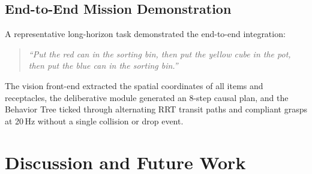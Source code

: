 \documentclass[conference]{IEEEtran}
\begin{document}
\begin{table}[!t]
\centering
\caption{End-to-End Subsystem Performance and Latency Breakdown}
\label{tab:subsystem_performance}
\end{table}

\subsection{End-to-End Mission Demonstration}
A representative long-horizon task demonstrated the end-to-end integration:
\begin{quote}
\textit{``Put the red can in the sorting bin, then put the yellow cube in the pot, then put the blue can in the sorting bin.''}
\end{quote}
The vision front-end extracted the spatial coordinates of all items and receptacles, the deliberative module generated an 8-step causal plan, and the Behavior Tree ticked through alternating RRT transit paths and compliant grasps at 20\,Hz without a single collision or drop event.

\section{Discussion and Future Work}
\label{sec:discussion}
\end{document}
